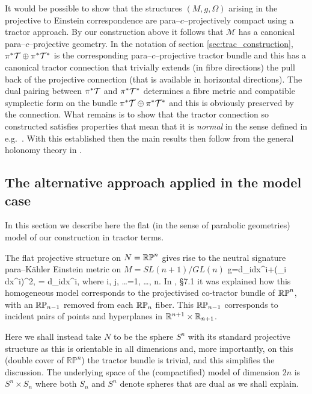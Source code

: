 It would be possible to show that the structures $(M,g,\Omega)$ arising in the projective to Einstein correspondence are para--$c$--projectively compact using a tractor approach. By our construction above it follows that $\mathcal{M}$ has a canonical para--$c$--projective geometry. In the notation of section \ref{sec:trac_construction}, $\pi^*{\mathcal{T}}\oplus
\pi^*{\mathcal{T}^*}$ is the corresponding para--$c$--projective tractor bundle
and this has a canonical tractor connection that trivially
extends (in fibre directions) the pull back of the projective
connection (that is available in horizontal directions). The
dual pairing between $\pi^*{\mathcal{T}}$ and $\pi^*{\mathcal{T}^*}$ determines a
fibre metric and compatible symplectic form on the bundle
$\pi^*{\mathcal{T}}\oplus \pi^*{\mathcal{T}^*}$ and this is obviously preserved by the
connection. What remains is to show that the tractor connection so
constructed satisfies properties that mean that it is {\em normal} in
the sense defined in e.g.\ \cite{CS-book}. With this established then
the main results then follow from the general holonomy theory in
\cite{CGH-duke}.


\subsection{The alternative approach applied in the model case}


In this section we describe here the flat (in the sense of parabolic
geometries) model \cite{CDT13, DM} of our construction in tractor
terms.

The flat projective structure on $N=\mathbb{RP}^n$ gives rise to 
the neutral signature para--K\"ahler Einstein metric on $M=SL(n+1)/GL(n)$
\be
\label{DM_metric}
g=d\zeta_i\odot dx^i+(\zeta_i dx^i)^2, \quad \Omega= d\zeta_i\wedge dx^i, \quad\mbox{where}\quad
i, j, \dots =1, \dots, n.
\ee
In \cite{DM}, \S 7.1 it was explained how this homogeneous model
corresponds to the projectivised co-tractor bundle of $\mathbb{RP}^n$, with
an $\mathbb{RP}_{n-1}$ removed from each $\mathbb{RP}_n$ fiber. This $\mathbb{RP}_{n-1}$
corresponds to incident pairs of points and hyperplanes in $\mathbb{R}^{n+1}\times\mathbb{R}_{n+1}$.


Here we shall instead take $N$ to be the sphere $S^n$ with its standard
projective structure as this is orientable in all dimensions and, more
importantly, on this (double cover of $\mathbb{R}\mathbb{P}^n$) the
tractor bundle is trivial, and this simplifies the discussion.  The
underlying space of the (compactified) model of dimension $2n$ is
$S^n\times S_n$ where both $S_n$ and $S^n$ denote spheres that are
dual as we shall explain.

